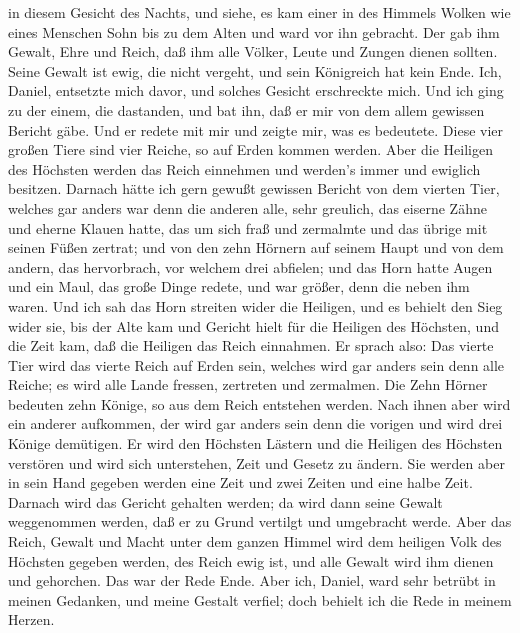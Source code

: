 in diesem Gesicht des Nachts, und siehe, es kam einer in des Himmels
Wolken wie eines Menschen Sohn bis zu dem Alten und ward vor ihn
gebracht.  Der gab ihm Gewalt, Ehre und Reich, daß ihm alle
Völker, Leute und Zungen dienen sollten. Seine Gewalt ist ewig, die
nicht vergeht, und sein Königreich hat kein Ende.  Ich,
Daniel, entsetzte mich davor, und solches Gesicht erschreckte mich.
 Und ich ging zu der einem, die dastanden, und bat ihn, daß
er mir von dem allem gewissen Bericht gäbe. Und er redete mit mir und
zeigte mir, was es bedeutete.  Diese vier großen Tiere sind
vier Reiche, so auf Erden kommen werden.  Aber die Heiligen
des Höchsten werden das Reich einnehmen und werden's immer und ewiglich
besitzen.  Darnach hätte ich gern gewußt gewissen Bericht
von dem vierten Tier, welches gar anders war denn die anderen alle, sehr
greulich, das eiserne Zähne und eherne Klauen hatte, das um sich fraß
und zermalmte und das übrige mit seinen Füßen zertrat;  und
von den zehn Hörnern auf seinem Haupt und von dem andern, das
hervorbrach, vor welchem drei abfielen; und das Horn hatte Augen und ein
Maul, das große Dinge redete, und war größer, denn die neben ihm waren.
 Und ich sah das Horn streiten wider die Heiligen, und es
behielt den Sieg wider sie,  bis der Alte kam und Gericht
hielt für die Heiligen des Höchsten, und die Zeit kam, daß die Heiligen
das Reich einnahmen.  Er sprach also: Das vierte Tier wird
das vierte Reich auf Erden sein, welches wird gar anders sein denn alle
Reiche; es wird alle Lande fressen, zertreten und zermalmen.
 Die Zehn Hörner bedeuten zehn Könige, so aus dem Reich
entstehen werden. Nach ihnen aber wird ein anderer aufkommen, der wird
gar anders sein denn die vorigen und wird drei Könige demütigen.
 Er wird den Höchsten Lästern und die Heiligen des Höchsten
verstören und wird sich unterstehen, Zeit und Gesetz zu ändern. Sie
werden aber in sein Hand gegeben werden eine Zeit und zwei Zeiten und
eine halbe Zeit.  Darnach wird das Gericht gehalten werden;
da wird dann seine Gewalt weggenommen werden, daß er zu Grund vertilgt
und umgebracht werde.  Aber das Reich, Gewalt und Macht
unter dem ganzen Himmel wird dem heiligen Volk des Höchsten gegeben
werden, des Reich ewig ist, und alle Gewalt wird ihm dienen und
gehorchen.  Das war der Rede Ende. Aber ich, Daniel, ward
sehr betrübt in meinen Gedanken, und meine Gestalt verfiel; doch behielt
ich die Rede in meinem Herzen.

